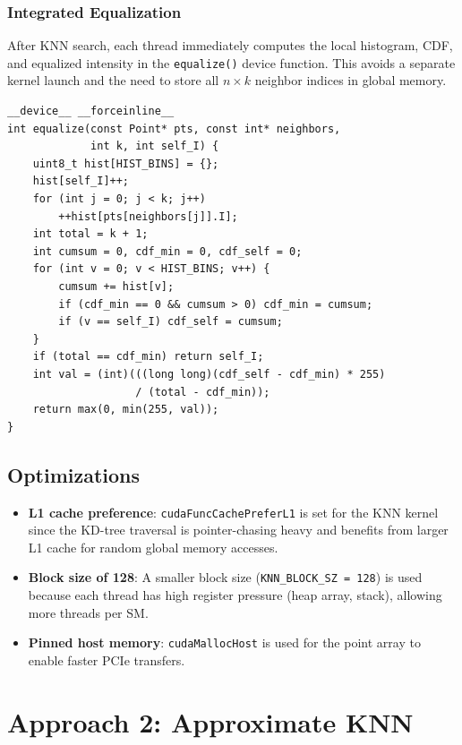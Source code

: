 \documentclass[11pt,a4paper]{article}
\begin{document}
\subsubsection{Integrated Equalization}

After KNN search, each thread immediately computes the local histogram, CDF, and equalized intensity in the \texttt{equalize()} device function. This avoids a separate kernel launch and the need to store all $n \times k$ neighbor indices in global memory.

\begin{lstlisting}[caption={Inline equalization after KNN search}]
__device__ __forceinline__
int equalize(const Point* pts, const int* neighbors,
             int k, int self_I) {
    uint8_t hist[HIST_BINS] = {};
    hist[self_I]++;
    for (int j = 0; j < k; j++)
        ++hist[pts[neighbors[j]].I];
    int total = k + 1;
    int cumsum = 0, cdf_min = 0, cdf_self = 0;
    for (int v = 0; v < HIST_BINS; v++) {
        cumsum += hist[v];
        if (cdf_min == 0 && cumsum > 0) cdf_min = cumsum;
        if (v == self_I) cdf_self = cumsum;
    }
    if (total == cdf_min) return self_I;
    int val = (int)(((long long)(cdf_self - cdf_min) * 255)
                    / (total - cdf_min));
    return max(0, min(255, val));
}
\end{lstlisting}

\subsection{Optimizations}

\begin{itemize}
    \item \textbf{L1 cache preference}: \texttt{cudaFuncCachePreferL1} is set for the KNN kernel since the KD-tree traversal is pointer-chasing heavy and benefits from larger L1 cache for random global memory accesses.
    \item \textbf{Block size of 128}: A smaller block size (\texttt{KNN\_BLOCK\_SZ = 128}) is used because each thread has high register pressure (heap array, stack), allowing more threads per SM.
    \item \textbf{Pinned host memory}: \texttt{cudaMallocHost} is used for the point array to enable faster PCIe transfers.
\end{itemize}

\section{Approach 2: Approximate KNN}
\end{document}
